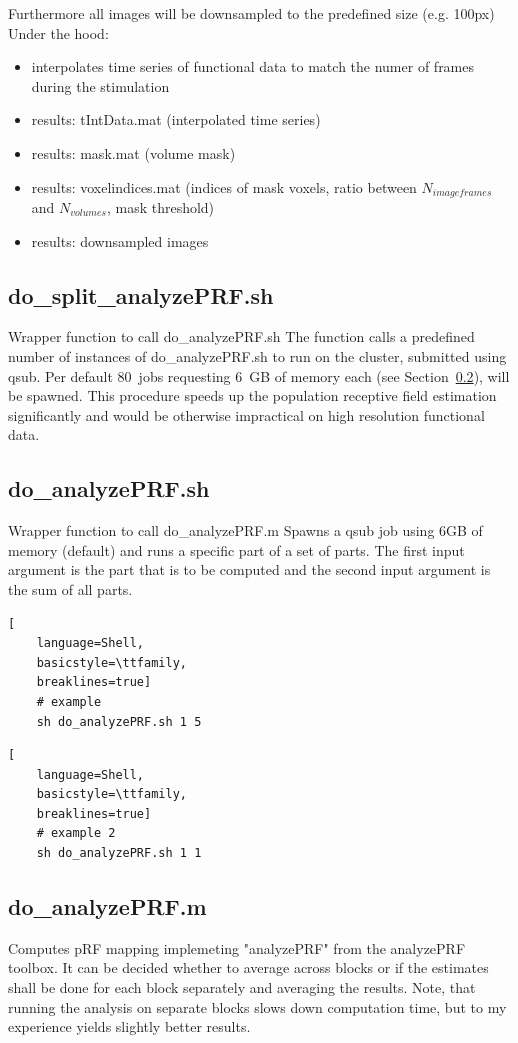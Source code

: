 \documentclass[12pt,a4paper]{scrartcl}
\begin{document}
\noindent Furthermore all images will be downsampled to the predefined size (e.g. 100px)\\

\noindent Under the hood:
\begin{itemize}
\item interpolates time series of functional data to match the numer of frames during the stimulation
\item results: tIntData.mat (interpolated time series)
\item results: mask.mat (volume mask)
\item results: voxelindices.mat (indices of mask voxels, ratio between $N_{imageframes}$ and $N_{volumes}$, mask threshold)
\item results: downsampled images
\end{itemize}

\subsection{do\_split\_analyzePRF.sh}
\label{sec:splitanalyzePRF.sh}
Wrapper function to call do\_analyzePRF.sh The function calls a predefined number of instances of do\_analyzePRF.sh to run on the cluster, submitted using qsub. Per default 80~jobs requesting 6~GB of memory each (see Section~\ref{sec:analyzePRF.sh}), will be spawned. This procedure speeds up the population receptive field estimation significantly and would be otherwise impractical on high resolution functional data.\\

\subsection{do\_analyzePRF.sh}
\label{sec:analyzePRF.sh}
Wrapper function to call do\_analyzePRF.m Spawns a qsub job using 6GB of memory (default) and runs a specific part of a set of parts. The first input argument is the part that is to be computed and the second input argument is the sum of all parts.
\begin{lstlisting}[
    language=Shell,
    basicstyle=\ttfamily,
    breaklines=true]
    # example
    sh do_analyzePRF.sh 1 5
\end{lstlisting}
\begin{lstlisting}[
    language=Shell,
    basicstyle=\ttfamily,
    breaklines=true]
    # example 2
    sh do_analyzePRF.sh 1 1
\end{lstlisting}

\subsection{do\_analyzePRF.m}
Computes pRF mapping implemeting "analyzePRF" from the analyzePRF toolbox. It can be decided whether to average across blocks or if the estimates shall be done for each block separately and averaging the results. Note, that running the analysis on separate blocks slows down computation time, but to my experience yields slightly better results.\\
\end{document}
